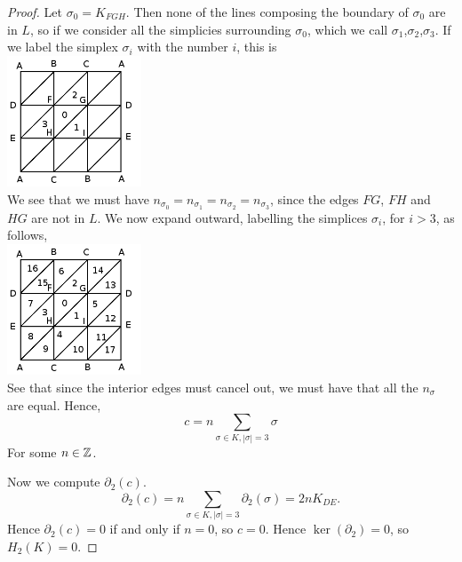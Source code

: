 \documentclass{unswmaths}
\begin{document}
\begin{proof}
Let $\sigma_0 = K_{FGH}$. Then none of the lines composing the boundary of $\sigma_0$
are in $L$, so if we consider all the simplicies surrounding $\sigma_0$, which we call
$\sigma_1$,$\sigma_2$,$\sigma_3$. If we label the simplex $\sigma_i$
with the number $i$, this is\\
\includegraphics[width=40mm]{klein2.png}\\
We see that we must have $n_{\sigma_0} = n_{\sigma_1} = n_{\sigma_2} = n_{\sigma_3}$,
since the edges $FG$, $FH$ and $HG$ are not in $L$.
We now expand outward, labelling the simplices $\sigma_i$, for $i > 3$, as follows,\\
\includegraphics[width=40mm]{klein3.png}\\
See that since the interior edges must cancel out, we must have 
that all the $n_\sigma$ are equal. Hence,
\begin{equation*}
    c = n\sum_{\sigma \in K,|\sigma| =3} \sigma
\end{equation*}
For some $n \in \mathbb{Z}$.

Now we compute $\partial_2(c)$. 
\begin{equation*}
    \partial_2(c) = n\sum_{\sigma \in K,|\sigma| = 3} \partial_2(\sigma) = 2nK_{DE}.
\end{equation*}
Hence $\partial_2(c) = 0$ if and only if $n = 0$, so $c = 0$. Hence $\ker(\partial_2) = 0$,
so $H_2(K) = 0$.


\end{proof}
\end{document}
